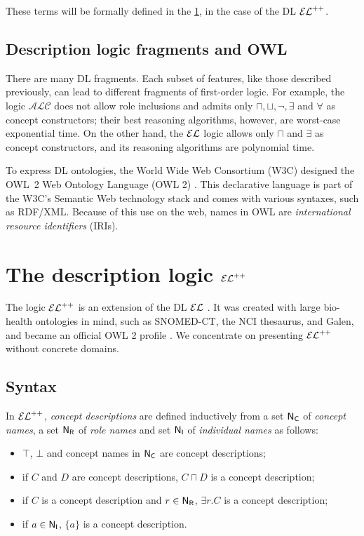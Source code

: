 These terms will be formally defined in the \cref{sec:el}, in the case of the DL $\mathcal{EL}^{++}$.

\subsection{Description logic fragments and OWL}

There are many DL fragments. Each subset of features, like those described previously, can lead to different fragments of first-order logic. For example, the logic $\mathcal{ALC}$ does not allow role inclusions and admits only $\sqcap, \sqcup, \lnot, \exists$ and $\forall$ as concept constructors; their best reasoning algorithms, however, are worst-case exponential time. On the other hand, the $\mathcal{EL}$ logic allows only $\sqcap$ and $\exists$ as concept constructors, and its reasoning algorithms are polynomial time.

To express DL ontologies, the World Wide Web Consortium (W3C) designed the OWL~2 Web Ontology Language (OWL 2) \citep{owl2}. This declarative language is part of the W3C's Semantic Web technology stack and comes with various syntaxes, such as RDF/XML. Because of this use on the web, names in OWL are \emph{international resource identifiers} (IRIs).

\section{The description logic \texorpdfstring{$\mathcal{EL}^{++}$}{GEL++}}
\label{sec:el}

The logic $\mathcal{EL}^{++}$ is an extension of the DL $\mathcal{EL}$ \citep{Baader2005a}. It was created with large bio-health ontologies in mind, such as SNOMED-CT, the NCI thesaurus, and Galen, and became an official OWL 2 profile \citep{owl2}. We concentrate on presenting $\mathcal{EL}^{++}$ without concrete domains.

\subsection{Syntax}
In $\mathcal{EL}^{++}$, \emph{concept descriptions} are defined inductively from a set $\mathsf{N_C}$ of \emph{concept names}, a set $\mathsf{N_R}$ of \emph{role names} and set $\mathsf{N_I}$ of \emph{individual names} as follows:
\begin{itemize}
	\item $\top$, $\bot$ and concept names in $\mathsf{N_C}$ are concept descriptions;
	\item if $C$ and $D$ are concept descriptions, $C \sqcap D$ is a concept description;
	\item if $C$ is a concept description and $r \in \mathsf{N_R}$, $\exists r.C$ is a concept description;
	\item if $a \in \mathsf{N_I}$, $\{a\}$ is a concept description.
\end{itemize}

